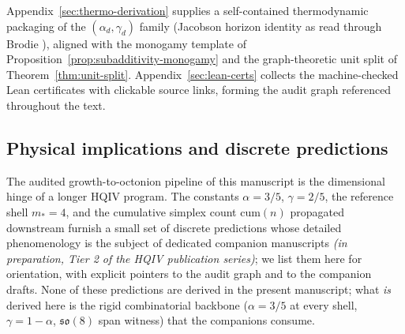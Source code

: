 \documentclass[11pt]{amsart}
\begin{document}
Appendix~\ref{sec:thermo-derivation} supplies a self-contained thermodynamic packaging of the \((\alpha_d,\gamma_d)\) family (Jacobson horizon identity as read through Brodie \cite{brodie2026}), aligned with the monogamy template of Proposition~\ref{prop:subadditivity-monogamy} and the graph-theoretic unit split of Theorem~\ref{thm:unit-split}. Appendix~\ref{sec:lean-certs} collects the machine-checked Lean certificates with clickable source links, forming the audit graph referenced throughout the text.

\subsection{Physical implications and discrete predictions}
\label{subsec:physical-implications}

The audited growth-to-octonion pipeline of this manuscript is the dimensional hinge of a longer HQIV program. The constants \(\alpha=3/5\), \(\gamma=2/5\), the reference shell \(m_\ast=4\), and the cumulative simplex count \(\mathrm{cum}(n)\) propagated downstream furnish a small set of discrete predictions whose detailed phenomenology is the subject of dedicated companion manuscripts \emph{(in preparation, Tier 2 of the HQIV publication series)}; we list them here for orientation, with explicit pointers to the audit graph and to the companion drafts. None of these predictions are derived in the present manuscript; what \emph{is} derived here is the rigid combinatorial backbone (\(\alpha=3/5\) at every shell, \(\gamma=1-\alpha\), \(\mathfrak{so}(8)\) span witness) that the companions consume.
\end{document}
